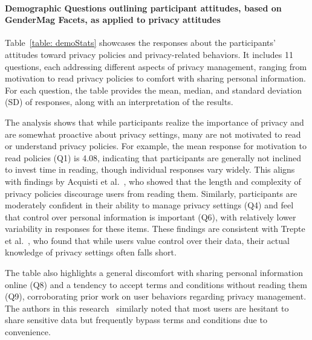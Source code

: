 

\paragraph{Demographic Questions outlining participant attitudes, based on GenderMag Facets, as applied to privacy attitudes}
Table~\ref{table: demoStats} showcases the responses about the participants' attitudes toward privacy policies and privacy-related behaviors.
It includes 11 questions, each addressing different aspects of privacy management, ranging from motivation to read privacy policies to comfort with sharing personal information.
For each question, the table provides the mean, median, and standard deviation (SD) of responses, along with an interpretation of the results.

The analysis shows that while participants realize the importance of privacy and are somewhat proactive about privacy settings, many are not motivated to read or understand privacy policies.
For example, the mean response for motivation to read policies (Q1) is 4.08, indicating that participants are generally not inclined to invest time in reading, though individual responses vary widely.
This aligns with findings by Acquisti et al.~\cite{acquisti2015privacy}, who showed that the length and complexity of privacy policies discourage users from reading them.
Similarly, participants are moderately confident in their ability to manage privacy settings (Q4) and feel that control over personal information is important (Q6), with relatively lower variability in responses for these items. 
These findings are consistent with Trepte et al.~\cite{trepte2011privacy}, who found that while users value control over their data, their actual knowledge of privacy settings often falls short.

The table also highlights a general discomfort with sharing personal information online (Q8) and a tendency to accept terms and conditions without reading them (Q9), corroborating prior work on user behaviors regarding privacy management.
The authors in this research~\cite{gross2005information} similarly noted that most users are hesitant to share sensitive data but frequently bypass terms and conditions due to convenience.


